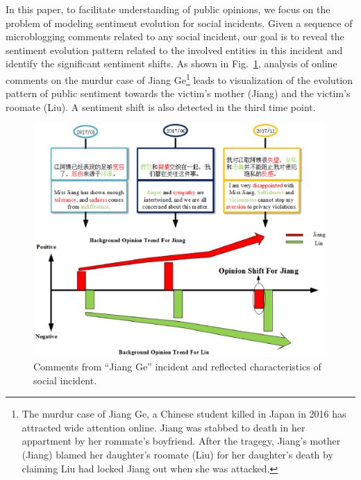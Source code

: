 \documentclass[runningheads]{llncs}
\begin{document}
In this paper, to facilitate understanding of public opinions, we focus on the problem of modeling sentiment evolution for social incidents. 
Given a sequence of microblogging comments related to any social incident, our goal is to reveal the sentiment evolution pattern related to the involved entities in this incident and identify the significant sentiment shifts. 
As shown in Fig.~\ref{fig:tweet}, analysis of online comments on the murdur case of Jiang Ge\footnote{The murdur case of Jiang Ge, a Chinese student killed in Japan in 2016 has attracted wide attention online. Jiang was stabbed to death in her appartment by her rommate's boyfriend. After the tragegy, Jiang's mother (Jiang) blamed her daughter's roomate (Liu) for her daughter's death by claiming Liu had locked Jiang out when she was attacked.} leads to visualization of the evolution pattern of public sentiment towards the victim's mother (Jiang) and the victim's roomate (Liu). A sentiment shift is also detected in the third time point. %


\begin{figure}
    \centering
    \includegraphics[width=1.0\textwidth,height=3.5in]{tweet.eps}
    \setlength{\abovecaptionskip}{-0.1cm}
    \caption{Comments from ``Jiang Ge'' incident and reflected characteristics of social incident.}\label{fig:tweet}
\end{figure}
\end{document}
